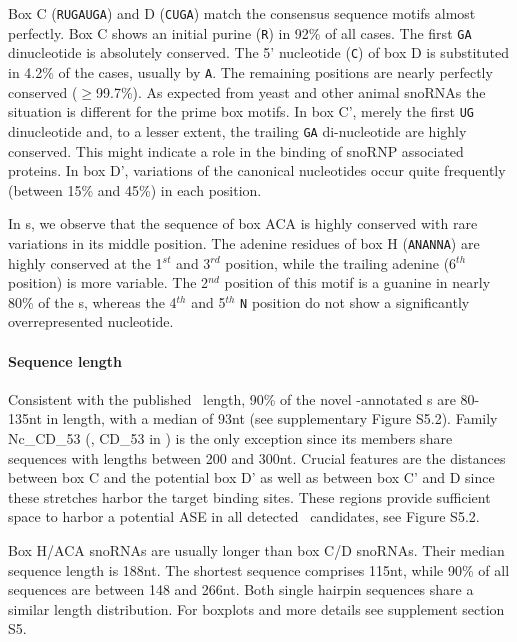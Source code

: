 Box C (\texttt{RUGAUGA}) and D (\texttt{CUGA}) match the consensus sequence
motifs almost perfectly. Box C shows an initial purine (\texttt{R}) in 92\%
of all cases.  The first \texttt{GA} dinucleotide is absolutely conserved.
The 5' nucleotide (\texttt{C}) of box D is substituted in 4.2\% of the
cases, usually by \texttt{A}. The remaining positions are nearly perfectly
conserved ($\ge$99.7\%). As expected from yeast and other animal snoRNAs
the situation is different for the prime box motifs.  In box C', merely the
first \texttt{UG} dinucleotide and, to a lesser extent, the trailing
\texttt{GA} di-nucleotide are highly conserved.  This might indicate a role
in the binding of snoRNP associated proteins.  In box D', variations of the
canonical nucleotides occur quite frequently (between 15\% and 45\%) in
each position.

In \haca s, we observe that the sequence of box ACA is highly conserved
with rare variations in its middle position. The adenine residues of box H
(\texttt{ANANNA}) are highly conserved at the 1$^{st}$ and 3$^{rd}$
position, while the trailing adenine (6$^{th}$ position) is more
variable. The 2$^{nd}$ position of this motif is a guanine in nearly 80\%
of the \haca s, whereas the 4$^{th}$ and 5$^{th}$ \texttt{N} position do
not show a significantly overrepresented nucleotide.

\paragraph{\textbf{Sequence length}} Consistent with the published \cd\
length, 90\% of the novel \snostrip-annotated \sno s are 80-135nt in
length, with a median of 93nt (see supplementary Figure S5.2).  Family
Nc\_CD\_53 (\ncr, CD\_53 in \snostrip) is the only exception since its
members share sequences with lengths between 200 and 300nt.  Crucial
features are the distances between box C and the potential box D' as well
as between box C' and D since these stretches harbor the target binding
sites. These regions provide sufficient space to harbor a potential ASE in
all detected \sno\ candidates, see Figure S5.2.

Box H/ACA snoRNAs are usually longer than box C/D snoRNAs. Their median
sequence length is 188nt. The shortest sequence comprises 115nt, while 90\%
of all sequences are between 148 and 266nt.  Both single hairpin sequences
share a similar length distribution. For boxplots and more details see
supplement section S5.

